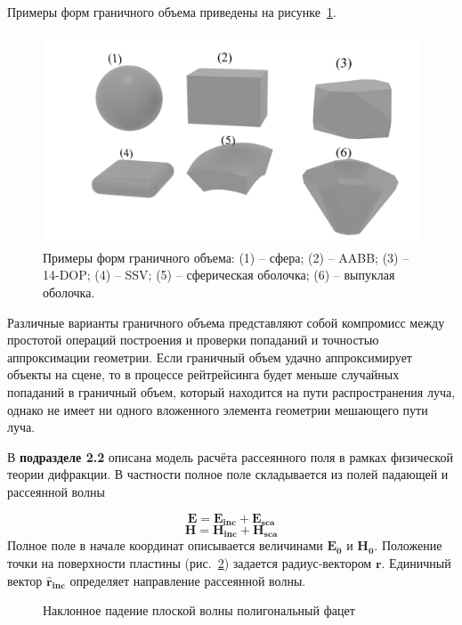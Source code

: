 Примеры форм граничного объема приведены на рисунке~\ref{fig:bvh-shapes}.

\begin{figure}[h]
    \centering
    \includegraphics[width=0.7\linewidth]{Synopsis/images/bounding_volumes.png}
    \caption{Примеры форм граничного объема: (1) -- сфера; (2) --
        AABB; (3) -- 14-DOP; (4) -- SSV; (5) -- сферическая оболочка; (6) --
        выпуклая оболочка.}
    \label{fig:bvh-shapes}
\end{figure}

Различные варианты граничного объема представляют собой компромисс между
простотой операций построения и проверки попаданий и точностью
аппроксимации геометрии. Если граничный объем удачно аппроксимирует
объекты на сцене, то в процессе рейтрейсинга будет меньше случайных
попаданий в граничный объем, который находится на пути распространения
луча, однако не имеет ни одного вложенного элемента геометрии мешающего
пути луча.

В \textbf{подразделе 2.2} описана модель расчёта рассеянного поля в рамках физической
теории дифракции.
В частности полное поле складывается из полей падающей и рассеянной волны

\[ \mathbf{E}=\mathbf{E_{inc}} + \mathbf{E_{sca}}  \]
\[ \mathbf{H}=\mathbf{H_{inc}} + \mathbf{H_{sca}}  \]
Полное поле в начале координат описывается величинами $ \mathbf{E_0}$ и $\mathbf{H_0}$.
Положение точки на поверхности пластины (рис.~\ref{fig:facet_po}) задается радиус-вектором
$\mathbf{r}$. Единичный вектор $\hat{\mathbf{r}}_\mathbf{inc}$ определяет направление
рассеянной волны.
\begin{figure}[h]
    \caption{Наклонное падение плоской волны полигональный фацет} \label{fig:facet_po}
\end{figure}

